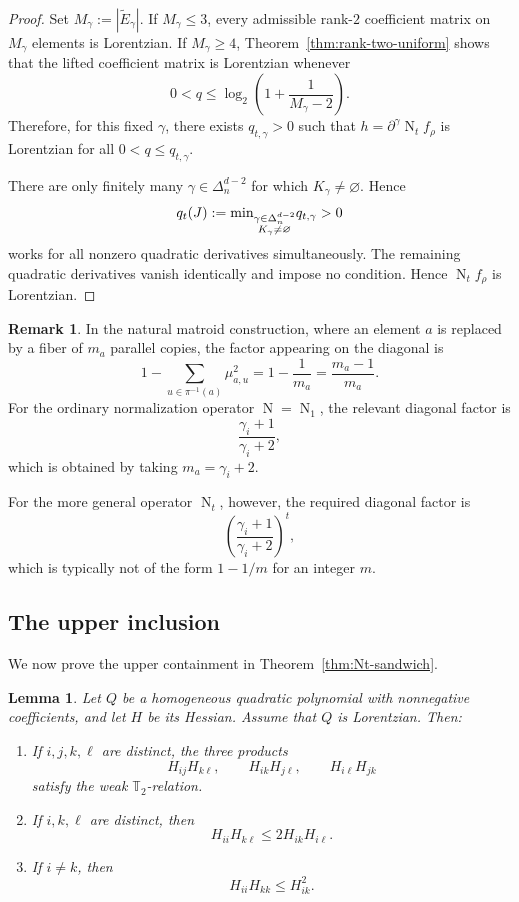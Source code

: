 \documentclass[12pt]{amsart}
\newtheorem{lemma}[theorem]{Lemma}
\theoremstyle{definition}
\newtheorem{remark}[theorem]{Remark}
\newcommand{\1}{\mathbf{1}}
\DeclareMathOperator{\upN}{N}   %
\newcommand\T{{\mathbb T}}
\renewcommand{\min}{\textup{min}}
\renewcommand\emptyset\varnothing
\begin{document}
\begin{proof}
Set $M_\gamma:=|\widetilde E_\gamma|$.
If $M_\gamma\le 3$, every
admissible rank-$2$ coefficient matrix on $M_\gamma$ elements is Lorentzian.  If
$M_\gamma\ge 4$, Theorem~\ref{thm:rank-two-uniform} shows that the lifted
coefficient matrix is Lorentzian whenever
\[
0<q\le
\log_2\left(1+\frac1{M_\gamma-2}\right).
\]
Therefore, for this fixed $\gamma$, there exists $q_{t,\gamma}>0$ such that
$h=\partial^\gamma\upN_t f_\rho$ is Lorentzian for all
$0<q\le q_{t,\gamma}$.

There are only finitely many $\gamma\in \Delta_n^{d-2}$ for which
$K_\gamma\ne\emptyset$.  Hence
\[
q_t(J):=\min_{\substack{\gamma\in\Delta_n^{d-2}\\ K_\gamma\ne\emptyset}}
q_{t,\gamma}>0
\]
works for all nonzero quadratic derivatives simultaneously.  The remaining
quadratic derivatives vanish identically and impose no condition. Hence $\upN_t f_\rho$ is
Lorentzian.
\end{proof}

\begin{remark}
In the natural matroid construction, where an element $a$ is replaced by a fiber of $m_a$ parallel copies,
the factor appearing on the diagonal is
\[
1-\sum_{u\in \pi^{-1}(a)}\mu_{a,u}^2
=
1-\frac{1}{m_a}
=
\frac{m_a-1}{m_a}.
\]
For the ordinary normalization operator
$\upN=\upN_1$, the relevant diagonal factor is 
\[
\frac{\gamma_i+1}{\gamma_i+2},
\]
which is obtained by taking $m_a=\gamma_i+2$.

For the more general operator $\upN_t$, however, the required diagonal factor is
\[
\left(\frac{\gamma_i+1}{\gamma_i+2}\right)^t,
\]
which is typically not of the form $1-1/m$ for an integer $m$.  
\end{remark}

\subsection{The upper inclusion}

We now prove the upper containment in Theorem~\ref{thm:Nt-sandwich}.

\begin{lemma}
\label{lem:quadratic-ineqs}
Let $Q$ be a homogeneous quadratic polynomial with nonnegative
coefficients, and let $H$ be its Hessian.
Assume that $Q$ is Lorentzian.  Then:
\begin{enumerate}
\item If $i,j,k,\ell$ are distinct, the three products
\[
H_{ij}H_{k\ell},\qquad
H_{ik}H_{j\ell},\qquad
H_{i\ell}H_{jk}
\]
satisfy the weak $\T_2$-relation.

\item If $i,k,\ell$ are distinct, then
\[
H_{ii}H_{k\ell}\le 2H_{ik}H_{i\ell}.
\]

\item If $i\ne k$, then
\[
H_{ii}H_{kk}\le H_{ik}^2.
\]
\end{enumerate}
\end{lemma}
\end{document}
